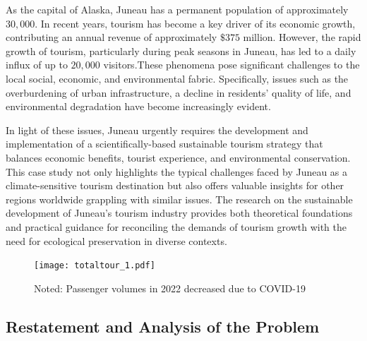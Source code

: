 \documentclass{mcmthesis}
\begin{document}
As the capital of Alaska, Juneau has a permanent population of approximately $30,000$. In recent years, 
tourism has become a key driver of its economic growth, contributing an annual revenue of approximately 
$\$375$ million. However, the rapid growth of tourism, particularly during peak seasons in Juneau, has led to 
a daily influx of up to $20,000$ visitors.These phenomena pose significant challenges to the local 
social, economic, and environmental fabric. Specifically, issues such as the overburdening of urban 
infrastructure, a decline in residents' quality of life, and environmental degradation have become 
increasingly evident.\par
In light of these issues, Juneau urgently requires the development and implementation of a 
scientifically-based sustainable tourism strategy that balances economic benefits, tourist 
experience, and environmental conservation. This case study not only highlights the typical 
challenges faced by Juneau as a climate-sensitive tourism destination but also offers valuable 
insights for other regions worldwide grappling with similar issues. The research on the sustainable 
development of Juneau's tourism industry provides both theoretical foundations and practical 
guidance for reconciling the demands of tourism growth with the need for ecological preservation in 
diverse contexts.

\begin{figure}[h] 
  \centering
  \texttt{[image: totaltour\_1.pdf]}
  \caption*{Noted: Passenger volumes in 2022 decreased due to COVID-19}\label{fig1}
  \end{figure}

  \subsection{Restatement and Analysis of the Problem}
\end{document}
